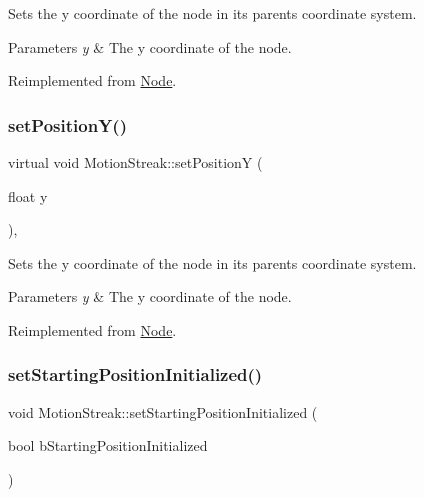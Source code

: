 Sets the y coordinate of the node in its parent\textquotesingle{}s coordinate system.


\begin{DoxyParams}{Parameters}
{\em y} & The y coordinate of the node. \\
\hline
\end{DoxyParams}


Reimplemented from \hyperlink{classNode_a5c97d36655f0daa71a5f6c715d2b0470}{Node}.

\mbox{\label{classMotionStreak_a75b545604e6a5f2351f6d4b034edb185}} 
\subsubsection{\texorpdfstring{set\+Position\+Y()}{setPositionY()}\hspace{0.1cm}{\footnotesize\ttfamily [2/2]}}
{\footnotesize\ttfamily virtual void Motion\+Streak\+::set\+PositionY (\begin{DoxyParamCaption}\item[{float}]{y }\end{DoxyParamCaption})\hspace{0.3cm}{\ttfamily [override]}, {\ttfamily [virtual]}}

Sets the y coordinate of the node in its parent\textquotesingle{}s coordinate system.


\begin{DoxyParams}{Parameters}
{\em y} & The y coordinate of the node. \\
\hline
\end{DoxyParams}


Reimplemented from \hyperlink{classNode_a5c97d36655f0daa71a5f6c715d2b0470}{Node}.

\mbox{\label{classMotionStreak_af5c5821339dbf85b0ec3277316a04198}} 
\subsubsection{\texorpdfstring{set\+Starting\+Position\+Initialized()}{setStartingPositionInitialized()}\hspace{0.1cm}{\footnotesize\ttfamily [1/2]}}
{\footnotesize\ttfamily void Motion\+Streak\+::set\+Starting\+Position\+Initialized (\begin{DoxyParamCaption}\item[{bool}]{b\+Starting\+Position\+Initialized }\end{DoxyParamCaption})\hspace{0.3cm}{\ttfamily [inline]}}

